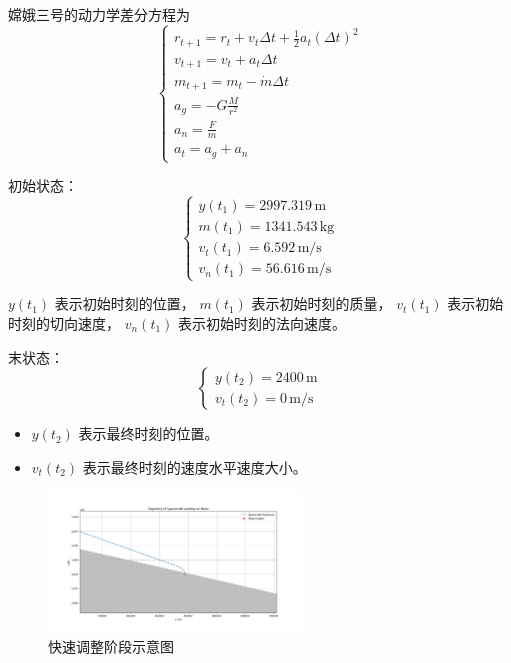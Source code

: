 \documentclass{ctexart}
\begin{document}
嫦娥三号的动力学差分方程为
\[
\begin{cases}
r_{t+1} = r_t + v_t \Delta t + \frac{1}{2} a_t (\Delta t)^2 \\
v_{t+1} = v_t + a_t \Delta t \\
m_{t+1} = m_t - \dot{m} \Delta t \\
a_g = - G \frac{M}{r^2} \\
a_n = \frac{F}{m} \\
a_t = a_g + a_n
\end{cases}
\]

初始状态：
\begin{equation}
\begin{cases}
y(t_1) = 2997.319 \, \text{m} \\
m(t_1) = 1341.543 \, \text{kg} \\
v_t(t_1) = 6.592 \, \text{m/s} \\
v_n(t_1) = 56.616 \, \text{m/s}
\end{cases}
\end{equation}


$y(t_1)$ 表示初始时刻的位置，
$m(t_1)$ 表示初始时刻的质量，
$v_t(t_1)$ 表示初始时刻的切向速度，
$v_n(t_1)$ 表示初始时刻的法向速度。

末状态：
\begin{equation}
\begin{cases}
y(t_2) = 2400 \, \text{m} \\
{v_t(t_2)} = 0 \, \text{m/s}
\end{cases}
\end{equation}

\begin{itemize}
\item $y(t_2)$ 表示最终时刻的位置。
\item ${v_t(t_2)}$ 表示最终时刻的速度水平速度大小。
\end{itemize}

    \begin{figure}[H] %
        \centering %
        \includegraphics[width=0.6\textwidth]{"./picture/stage2.png"} %
        \caption{快速调整阶段示意图} %
        \label{fig:example} %
    \end{figure}
\end{document}
